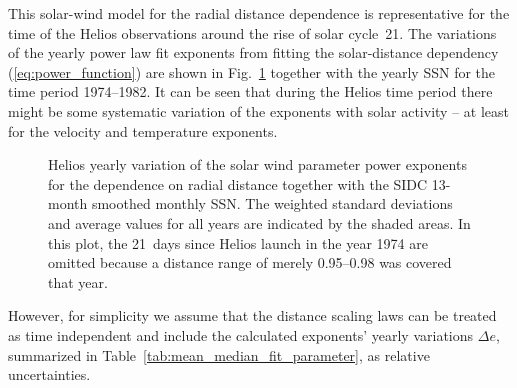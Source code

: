 \documentclass[]{aa}
\begin{document}
        This solar-wind model for the radial distance dependence is representative for the time of the Helios observations around the rise of solar cycle~21. The variations of the yearly power law fit exponents from fitting the solar-distance dependency (\ref{eq:power_function}) are shown in Fig.~\ref{fig:yearly_gradients_c} together with the yearly SSN for the time period \numrange{1974}{1982}. It can be seen that during the Helios time period there might be some systematic  variation of the exponents with solar activity -- at least for the velocity and temperature exponents.
        \begin{figure}
                \caption{Helios yearly variation of the solar wind parameter power exponents for the dependence on radial distance together with the SIDC 13-month smoothed monthly SSN. The weighted standard deviations and average values for all years are indicated by the shaded areas. In this plot, the 21~days since Helios launch in the year 1974 are omitted because a distance range of merely \SIrange{0.95}{0.98}{\au} was covered that year.}
                \label{fig:yearly_gradients_c}
        \end{figure}
        However, for simplicity we assume that the distance scaling laws can be treated as time independent and include the calculated exponents’ yearly variations $\Delta e$, summarized in Table~\ref{tab:mean_median_fit_parameter}, as relative uncertainties.
\end{document}
